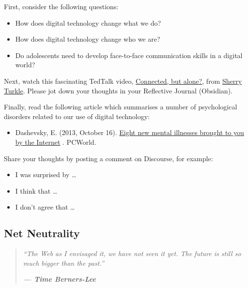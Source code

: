 \documentclass[
]{book}
\providecommand{\tightlist}{%
  \setlength{\itemsep}{0pt}\setlength{\parskip}{0pt}}
\theoremstyle{definition}
\theoremstyle{definition}
\theoremstyle{definition}
\theoremstyle{definition}
\theoremstyle{remark}
\begin{document}
\begin{reflect}
First, consider the following questions:

\begin{itemize}
\tightlist
\item
  How does digital technology change what we do?\\
\item
  How does digital technology change who we are?\\
\item
  Do adolescents need to develop face-to-face communication skills in a digital world?
\end{itemize}

Next, watch this fascinating TedTalk video, \href{https://www.youtube.com/watch?v=t7Xr3AsBEK4}{Connected, but alone?}, from \href{http://sherryturkle.mit.edu/}{Sherry Turkle}. Please jot down your thoughts in your Reflective Journal (Obsidian).

Finally, read the following article which summarises a number of psychological disorders related to our use of digital technology:

\begin{itemize}
\tightlist
\item
  Dashevsky, E. (2013, October 16). \href{https://www.pcworld.com/article/448085/eight-new-mental-illnesses-brought-to-you-by-wait-for-it-the-internet.html}{Eight new mental illnesses brought to you by the Internet} . PCWorld.
\end{itemize}

Share your thoughts by posting a comment on Discourse, for example:

\begin{itemize}
\tightlist
\item
  I was surprised by \ldots{}\\
\item
  I think that \ldots{}\\
\item
  I don't agree that \ldots{}
\end{itemize}
\end{reflect}

\hypertarget{net-neutrality}{%
\subsection{Net Neutrality}\label{net-neutrality}}

\begin{quote}
\emph{``The Web as I envisaged it, we have not seen it yet. The future is still so much bigger than the past.''}

\textbf{\emph{--- Time Berners-Lee}}
\end{quote}
\end{document}
